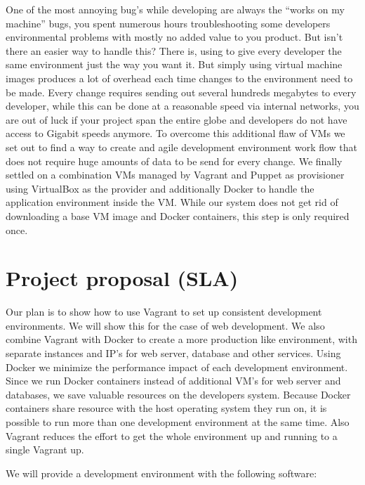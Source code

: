 One of the most annoying bug’s while developing are always the “works on my machine” bugs, you spent numerous hours troubleshooting some developers environmental problems with mostly no added value to you product. But isn’t there an easier way to handle this? There is, using to give every developer the same environment just the way you want it. But simply using virtual machine images produces a lot of overhead each time changes to the environment need to be made. Every change requires sending out several hundreds megabytes to every developer, while this can be done at a reasonable speed via internal networks, you are out of luck if your project span the entire globe and developers do not have access to Gigabit speeds anymore. To overcome this additional flaw of \glspl{VM} we set out to find a way to create and agile development environment work flow that does not require huge amounts of data to be send for every change.
We finally settled on a combination \glspl{VM} managed by Vagrant and Puppet as \gls{provisioner} using VirtualBox as the \gls{provider} and additionally Docker to handle the application environment inside the \gls{VM}. While our system does not get rid of downloading a base \gls{VM} image and Docker containers, this step is only required once.


\section{Project proposal (SLA)}

Our plan is to show how to use Vagrant to set up consistent development environments. We will show this for the case of web development. We also combine Vagrant with Docker to create a more production like environment, with separate instances and IP's for web server, database and other services. Using Docker we minimize the performance impact of each development environment. Since we run Docker containers instead of additional \gls{VM}'s for web server and databases, we save valuable resources on the developers system. Because Docker containers share resource with the host operating system they run on, it is possible to run more than one development environment at the same time. Also Vagrant reduces the effort to get the whole environment up and running to a single Vagrant up.

We will provide a development environment with the following software:

